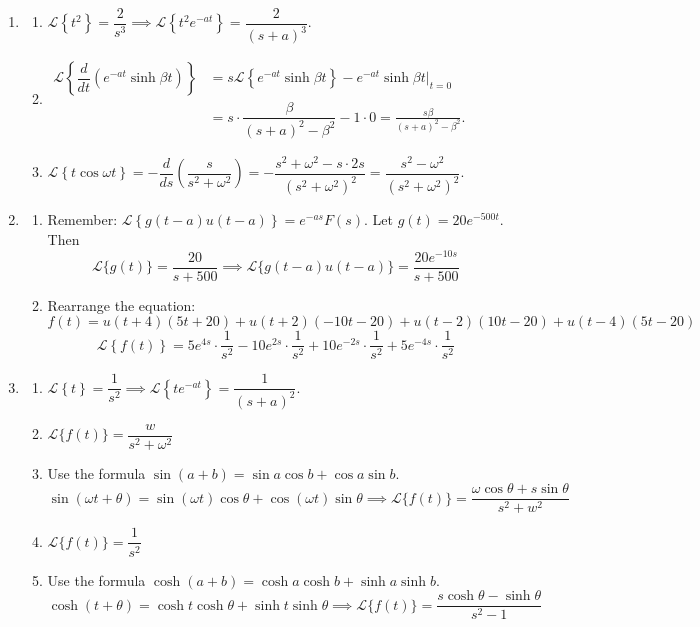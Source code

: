 \documentclass[11pt]{article}
\begin{document}
\begin{enumerate}[leftmargin=*,label=\textbf{2.\arabic*.}]

\item \begin{enumerate}[label=\textbf{\alph*)}]

\item $\mathscr{L}\left\{t^2\right\}=\dfrac{2}{s^3}\implies\mathscr{L}\left\{t^2e^{-at}\right\}=\boxed{\dfrac2{(s+a)^3}}.$
\item $\begin{array}{rl}\mathscr{L}\left\{\dfrac{d}{dt}(e^{-at}\sinh\beta t)\right\}&=s\mathscr{L}\left\{e^{-at}\sinh\beta t\right\}-e^{-at}\sinh\beta t|_{t=0}\\&=s\cdot\dfrac{\beta}{(s+a)^2-\beta^2}-1\cdot0=\boxed{\frac{s\beta}{(s+a)^2-\beta^2}}.\end{array}$
\item $\mathscr{L}\left\{t\cos\omega t\right\}=-\dfrac{d}{ds}\left(\dfrac{s}{s^2+\omega^2}\right)=-\dfrac{s^2+\omega^2-s\cdot2s}{(s^2+\omega^2)^2}=\boxed{\dfrac{s^2-\omega^2}{(s^2+\omega^2)^2}}.$

\end{enumerate}

\item \begin{enumerate}[label=\textbf{\alph*)}]
\item Remember: $\mathscr{L}\left\{g(t-a)u(t-a)\right\}=e^{-as}F(s)$. Let $g(t)=20e^{-500t}$. Then
\[\mathscr{L}\{g(t)\}=\frac{20}{s+500}\implies\mathscr{L}\{g(t-a)u(t-a)\}=\boxed{\frac{20e^{-10s}}{s+500}}\]
\item Rearrange the equation:
\[f(t)=u(t+4)(5t+20)+u(t+2)(-10t-20)+u(t-2)(10t-20)+u(t-4)(5t-20)\]
\[\mathscr{L}\left\{f(t)\right\}=\boxed{5e^{4s}\cdot\frac1{s^2}-10e^{2s}\cdot\frac1{s^2}+10e^{-2s}\cdot\frac1{s^2}+5e^{-4s}\cdot\frac1{s^2}}\]
\end{enumerate}

\item \begin{enumerate}[label=\textbf{\alph*)}]
\item $\mathscr{L}\left\{t\right\}=\dfrac{1}{s^2}\implies\mathscr{L}\left\{te^{-at}\right\}=\boxed{\dfrac1{(s+a)^2}}.$
\item $\mathscr{L}\{f(t)\}=\boxed{\dfrac{w}{s^2+\omega^2}}$
\item Use the formula $\sin(a+b)=\sin a\cos b+\cos a\sin b$.
\[\sin(\omega t+\theta)=\sin(\omega t)\cos\theta+\cos(\omega t)\sin\theta\implies\mathscr{L}\{f(t)\}=\boxed{\dfrac{\omega\cos\theta+s\sin\theta}{s^2+w^2}}\]
\item $\mathscr{L}\{f(t)\}=\boxed{\dfrac{1}{s^2}}$
\item Use the formula $\cosh(a+b)=\cosh a\cosh b+\sinh a\sinh b$.
\[\cosh(t+\theta)=\cosh t\cosh\theta+\sinh t\sinh\theta\implies\mathscr{L}\{f(t)\}=\boxed{\dfrac{s\cosh\theta-\sinh\theta}{s^2-1}}\]
\end{enumerate}


\end{enumerate}
\end{document}
